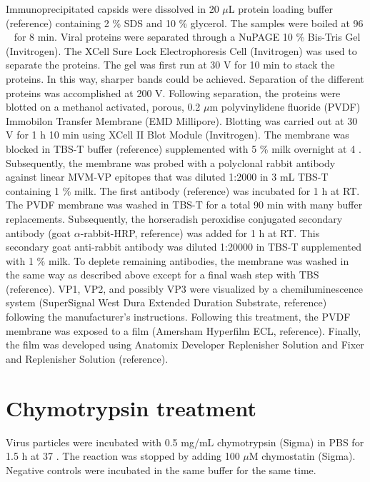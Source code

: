 Immunoprecipitated capsids were dissolved in 20 $\mu$L protein loading buffer (reference) containing 2 \% SDS and 10 \% glycerol. The samples were boiled at 96 \textcelsius~ for 8 min. Viral proteins were separated through a NuPAGE\textsuperscript{\textregistered} 10 \% Bis-Tris Gel (Invitrogen). The XCell Sure Lock\textsuperscript{\texttrademark} Electrophoresis Cell (Invitrogen) was used to separate the proteins. The gel was first run at 30 V for 10 min to stack the proteins. In this way, sharper bands could be achieved. Separation of the different proteins was accomplished at 200 V. Following separation, the proteins were blotted on a methanol activated, porous, 0.2 $\mu$m polyvinylidene fluoride (PVDF) Immobilon\textsuperscript{\textregistered} Transfer Membrane (EMD Millipore). Blotting was carried out at 30 V for 1 h 10 min using XCell II\textsuperscript{\texttrademark} Blot Module (Invitrogen). 
The membrane was blocked in TBS-T buffer (reference) supplemented with 5 \% milk overnight at 4 \textcelsius. Subsequently, the membrane was probed with a polyclonal rabbit antibody against linear MVM-VP epitopes that was diluted 1:2000 in 3 mL TBS-T containing 1 \% milk. The first antibody (reference) was incubated for 1 h at RT. The PVDF membrane was washed in TBS-T for a total 90 min with many buffer replacements. Subsequently, the horseradish peroxidise conjugated secondary antibody (goat $\alpha$-rabbit-HRP, reference) was added for 1 h at RT. This secondary goat anti-rabbit antibody was diluted 1:20000 in TBS-T supplemented with 1 \% milk. To deplete remaining antibodies, the membrane was washed in the same way as described above except for a final wash step with TBS (reference). VP1, VP2, and possibly VP3 were visualized by a chemiluminescence system (SuperSignal West Dura Extended Duration Substrate, reference) following the manufacturer’s instructions. Following this treatment, the PVDF membrane was exposed to a film (Amersham Hyperfilm\textsuperscript{\texttrademark} ECL, reference). Finally, the film was developed using Anatomix Developer Replenisher Solution and Fixer and Replenisher Solution (reference).



\section{Chymotrypsin treatment}

Virus particles were incubated with 0.5 mg/mL chymotrypsin (Sigma) in PBS for 1.5 h at 37 \textcelsius. The reaction was stopped by adding 100 $\mu$M chymostatin (Sigma). Negative controls were incubated in the same buffer for the same time.


